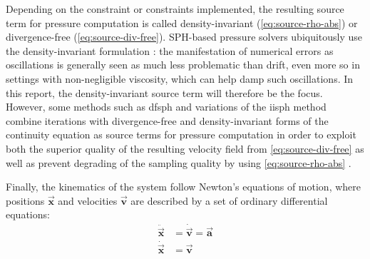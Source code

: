 \documentclass[conference]{IEEEtran}
\newcommand\vek[1]{\vec{\bm{#1}}}
\begin{document}

Depending on the constraint or constraints implemented, the resulting source term for pressure computation is called density-invariant (\autoref{eq:source-rho-abs}) or divergence-free (\autoref{eq:source-div-free}). SPH-based pressure solvers ubiquitously use the density-invariant formulation \autocites{iisph}{pcisph}{dfsph}{optimized-source-term}{pbf}: the manifestation of numerical errors as oscillations is generally seen as much less problematic than drift, even more so in settings with non-negligible viscosity, which can help damp such oscillations. 
In this report, the density-invariant source term will therefore be the focus.
However, some methods such as \ac{dfsph} \cite{dfsph} and variations of the \ac{iisph} method \cite{optimized-source-term} combine iterations with divergence-free and density-invariant forms of the continuity equation as source terms for pressure computation in order to exploit both the superior quality of the resulting velocity field from \autoref{eq:source-div-free} as well as prevent degrading of the sampling quality by using \autoref{eq:source-rho-abs} \cite{optimized-source-term}.

Finally, the kinematics of the system follow Newton's equations of motion, where positions $\vek{x}$ and velocities $\vek{v}$ are described by a set of ordinary differential equations:
\begin{equation}\label{eq:eqs-of-motions}
  \begin{split}
    \ddot{\vek{x}} &= \dot{\vek{v}} = \vek{a}\\
    \dot{\vek{x}} &= \vek{v}
  \end{split}
\end{equation}
\end{document}
